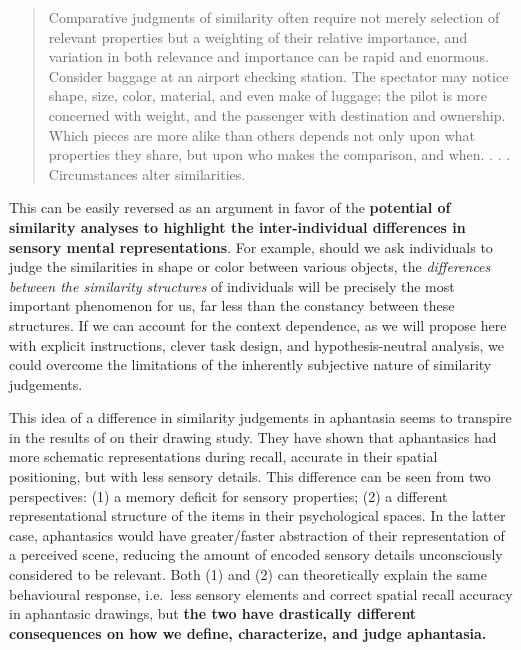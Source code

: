 \documentclass[
  authoryear]{elsarticle}
\begin{document}
\begin{quote}
Comparative judgments of similarity often require not merely selection
of relevant properties but a weighting of their relative importance, and
variation in both relevance and importance can be rapid and enormous.
Consider baggage at an airport checking station. The spectator may
notice shape, size, color, material, and even make of luggage; the pilot
is more concerned with weight, and the passenger with destination and
ownership. Which pieces are more alike than others depends not only upon
what properties they share, but upon who makes the comparison, and when.
. . . Circumstances alter similarities.
\end{quote}

This can be easily reversed as an argument in favor of the
\textbf{potential of similarity analyses to highlight the
inter-individual differences in sensory mental representations}. For
example, should we ask individuals to judge the similarities in shape or
color between various objects, the \emph{differences between the
similarity structures} of individuals will be precisely the most
important phenomenon for us, far less than the constancy between these
structures. If we can account for the context dependence, as we will
propose here with explicit instructions, clever task design, and
hypothesis-neutral analysis, we could overcome the limitations of the
inherently subjective nature of similarity judgements.

This idea of a difference in similarity judgements in aphantasia seems
to transpire in the results of
\citet{bainbridgeQuantifyingAphantasiaDrawing2021} on their drawing
study. They have shown that aphantasics had more schematic
representations during recall, accurate in their spatial positioning,
but with less sensory details. This difference can be seen from two
perspectives: (1) a memory deficit for sensory properties; (2) a
different representational structure of the items in their psychological
spaces. In the latter case, aphantasics would have greater/faster
abstraction of their representation of a perceived scene, reducing the
amount of encoded sensory details unconsciously considered to be
relevant. Both (1) and (2) can theoretically explain the same
behavioural response, i.e.~less sensory elements and correct spatial
recall accuracy in aphantasic drawings, but \textbf{the two have
drastically different consequences on how we define, characterize, and
judge aphantasia.}
\end{document}
